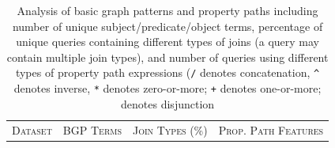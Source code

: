 \begin{table}
\setlength{\tabcolsep}{1.1ex}
\centering
\caption{Analysis of basic graph patterns and property paths including number of unique subject/predicate/object terms, percentage of unique queries containing different types of joins (a query may contain multiple join types), and number of queries using different types of property path expressions (\texttt{/} denotes concatenation, \texttt{\textasciicircum} denotes inverse, \texttt{*} denotes zero-or-more; \texttt{+} denotes one-or-more; \cenh{\texttt{|}} denotes disjunction}
\begin{tabular}{lrrrrrrrrrrrrr} \toprule
\multirow{2}{*}{\textsc{Dataset}} & \multicolumn{3}{c}{\textsc{BGP Terms}} & \multicolumn{5}{c}{\textsc{Join Types (\%)}} & \multicolumn{5}{c}{\textsc{Prop. Path Features}} \\ 


\end{tabular}
\end{table}
